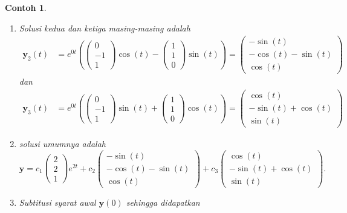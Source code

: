 \documentclass[a4paper]{article}
\theoremstyle{definisi}
\newtheorem{contoh}{Contoh}[subsection]
\numberwithin{equation}{section}
\begin{document}
\begin{contoh}
\begin{enumerate}[label=Langkah \arabic*: ,leftmargin=*]
      \item Solusi kedua dan ketiga masing-masing adalah
      \begin{align*}
        \mathbf{y}_2(t) &= e^{0t}\left(\begin{pmatrix}0\\-1\\1\end{pmatrix}\cos(t) - \begin{pmatrix}1\\1\\0\end{pmatrix}\sin(t)\right)=\begin{pmatrix}-\sin(t)\\-\cos(t)-\sin(t)\\\cos(t)\end{pmatrix}
      \end{align*}
      dan
      \begin{align*}
        \mathbf{y}_3(t) &= e^{0t}\left(\begin{pmatrix}0\\-1\\1\end{pmatrix}\sin(t) + \begin{pmatrix}1\\1\\0\end{pmatrix}\cos(t)\right)=\begin{pmatrix}\cos(t)\\-\sin(t)+\cos(t)\\\sin(t)\end{pmatrix}
      \end{align*}
      \item solusi umumnya adalah
      \[\mathbf{y}=c_1\begin{pmatrix}2\\2\\1\end{pmatrix}e^{2t} + c_2\begin{pmatrix}-\sin(t)\\-\cos(t)-\sin(t)\\\cos(t)\end{pmatrix} + c_3\begin{pmatrix}\cos(t)\\-\sin(t)+\cos(t)\\\sin(t)\end{pmatrix}.\]
      \item Subtitusi syarat awal $\mathbf{y}(0)$ sehingga didapatkan
      \begin{align*}

\end{align*}
\end{enumerate}
\end{contoh}
\end{document}
